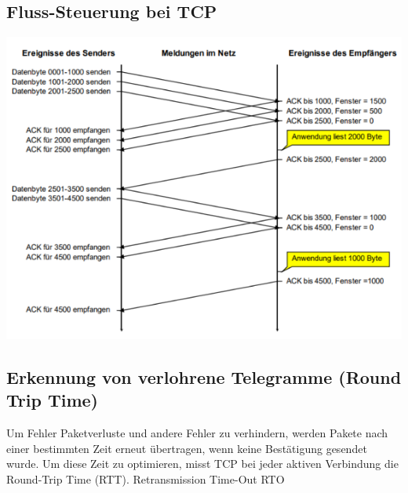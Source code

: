 \subsection{Fluss-Steuerung bei TCP}
{
    \includegraphics[scale=.45]{img/tcp-flow.png}}

\subsection{Erkennung von verlohrene Telegramme (Round Trip Time)}
{Um Fehler Paketverluste und andere Fehler zu verhindern, werden Pakete nach einer bestimmten Zeit erneut übertragen, wenn keine Bestätigung gesendet wurde.
    Um diese Zeit zu optimieren, misst TCP bei jeder aktiven Verbindung die Round-Trip Time (RTT).}
Retransmission Time-Out RTO